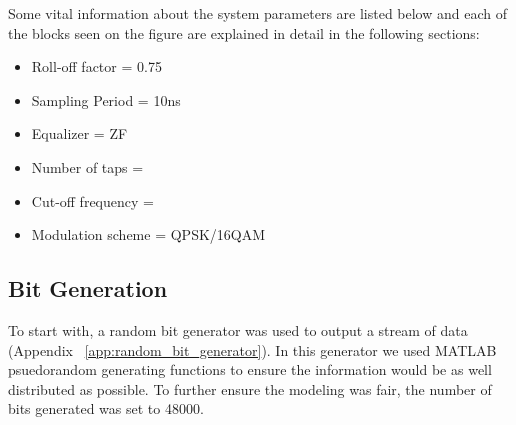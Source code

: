 \documentclass[]{article}
\begin{document}
Some vital information about the system parameters are listed below and each of the blocks seen on the figure are explained in detail in the following sections:
\begin{itemize}
\item Roll-off factor = 0.75
\item Sampling Period = 10ns
\item Equalizer = ZF
\item Number of taps =
\item Cut-off frequency = 
\item Modulation scheme = QPSK/16QAM
\end{itemize}

\subsection{Bit Generation}
\label{sec:bits}
 To start with, a random bit generator was used to output a stream of data (Appendix ~\ref{app:random_bit_generator}). In this generator we used MATLAB psuedorandom generating functions to ensure the information would be as well distributed as possible. To further ensure the modeling was fair, the number of bits generated was set to 48000. 
\end{document}
